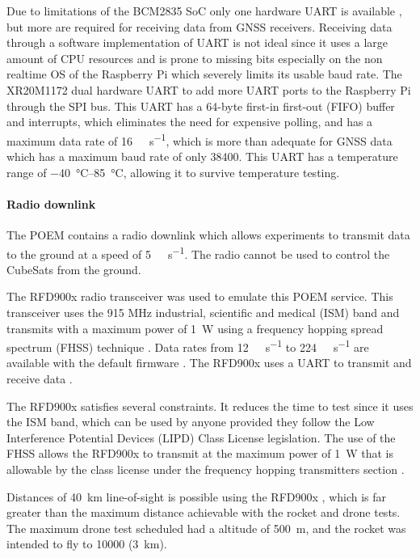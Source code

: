 \documentclass[a4paper,11pt]{article}
\begin{document}
Due to limitations of the BCM2835 SoC only one hardware UART is available \cite{upton2016raspberry}, but more are required for receiving data from GNSS receivers. Receiving data through a software implementation of UART is not ideal since it uses a large amount of CPU resources and is prone to missing bits especially on the non realtime OS of the Raspberry Pi which severely limits its usable baud rate. The XR20M1172 dual hardware UART to add more UART ports to the Raspberry Pi through the SPI bus. This UART has a 64-byte first-in first-out (FIFO) buffer and interrupts, which eliminates the need for expensive polling, and has a maximum data rate of \SI{16}{\mega\bit\per\second}, which is more than adequate for GNSS data \cite{maxlinear2022xr20m1172} which has a maximum baud rate of only \SI{38400}{\baud}. This UART has a temperature range of \SIrange{-40}{85}{\degreeCelsius}, allowing it to survive temperature testing.

\paragraph{Radio downlink}

The POEM contains a radio downlink which allows experiments to transmit data to the ground at a speed of \SI{5}{\kilo\bit\per\second}. The radio cannot be used to control the CubeSats from the ground.


The RFD900x radio transceiver was used to emulate this POEM service. This transceiver uses the 915 MHz industrial, scientific and medical (ISM) band and transmits with a maximum power of \SI{1}{\watt} using a frequency hopping spread spectrum (FHSS) technique \cite{rfdesign2020rfd900x}. Data rates from \SI{12}{\kilo\bit\per\second} to \SI{224}{\kilo\bit\per\second} are available with the default firmware \cite{rfdesign2020rfd900x}. The RFD900x uses a UART to transmit and receive data \cite{rfdesign2020rfd900x}.

The RFD900x satisfies several constraints. It reduces the time to test since it uses the ISM band, which can be used by anyone provided they follow the  Low Interference Potential Devices (LIPD) Class License legislation. The use of the FHSS allows the RFD900x to transmit at the maximum power of \SI{1}{\watt} that is allowable by the class license under the frequency hopping transmitters section \cite{australia2015radiocommunications}.

Distances of \SI{40}{\kilo\metre} line-of-sight is possible using the RFD900x \cite{rfdesign2020rfd900x}, which is far greater than the maximum distance achievable with the rocket and drone tests. The maximum drone test scheduled had a altitude of \SI{500}{\metre}, and the rocket was intended to fly to \SI{10000}{\feet} (\SI{3}{\kilo\metre}).
\end{document}
